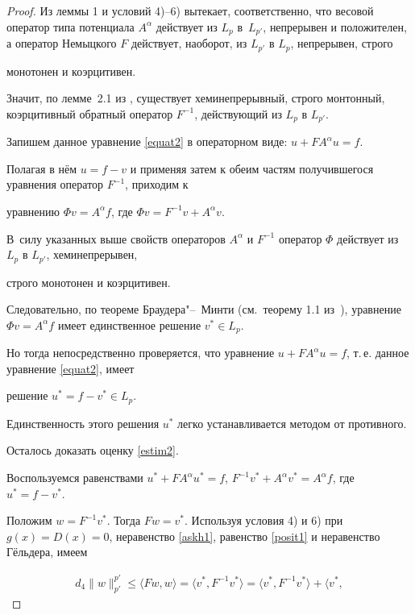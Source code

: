 \begin{proof}

Из леммы 1 и условий 4)--6) вытекает, соответственно, что весовой оператор типа потенциала $A^\alpha$ действует из $L_p$ в~$L_{p'}$, непрерывен и положителен, а оператор Немыцкого $F$ действует, наоборот, из $L_{p'}$ в $L_p$, непрерывен, строго

монотонен и коэрцитивен. 

Значит, по лемме~2.1 из \cite{askhabov:ASK}, существует хеминепрерывный, строго монтонный, коэрцитивный обратный оператор $F^{-1}$, действующий из $L_p$ в $L_{p'}$.



Запишем данное уравнение \eqref{equat2}  в операторном виде: $u+FA^\alpha u=f$. 

Полагая в нём $u=f-v$ и применяя затем к обеим частям получившегося уравнения оператор $F^{-1}$, приходим к

уравнению $\Phi v=A^\alpha f$, где $\Phi v=F^{-1}v+A^\alpha v$. 

В~силу указанных выше свойств операторов $A^\alpha$ и $F^{-1}$ оператор $\Phi$ действует из $L_p$ в $L_{p'}$, хеминепрерывен,

строго монотонен и коэрцитивен. 

Следовательно, по теореме Браудера"--~Минти (см.~теорему 1.1 из~\cite{askhabov:ASK}), уравнение $\Phi v=A^\alpha f$ имеет единственное решение $v^*\in L_p$. 

Но тогда непосредственно проверяется, что уравнение $u+FA^\alpha u=f$, т.\,е. данное уравнение \eqref{equat2}, имеет

решение $u^*=f-v^*\in L_p$. 

Единственность этого решения $u^*$ легко устанавливается методом от противного.



Осталось доказать оценку \eqref{estim2}. 

Воспользуемся равенствами $u^*+FA^\alpha u^*=f$, $F^{-1}v^*+A^\alpha v^*=A^\alpha f$, где $u^*=f-v^*$. 

Положим $w=F^{-1}v^*$. Тогда $Fw=v^*$. Используя условия 4) и 6) при $g(x)=D(x)=0$, неравенство \eqref{askh1}, равенство \eqref{posit1} и неравенство Гёльдера, имеем

\begin{multline*}

d_4\|w\|_{p'}^{p'}\leq \langle Fw, w\rangle=\langle v^*,

F^{-1}v^*\rangle=\langle v^*, F^{-1}v^*\rangle+\langle v^*,


\end{multline*}
\end{proof}

